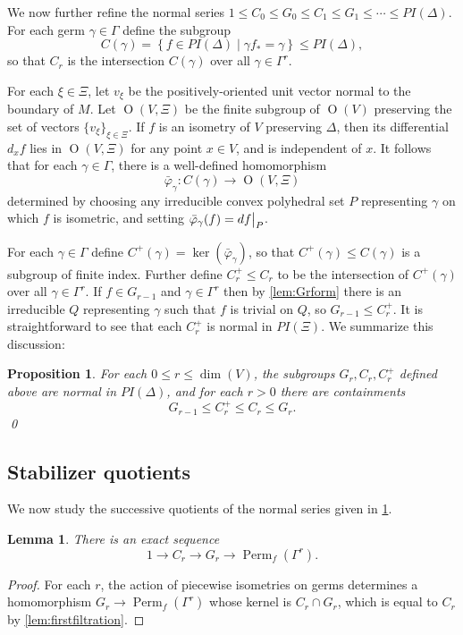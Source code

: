 \documentclass[11pt]{amsart}
\newtheorem{prop}[theorem]{Proposition}
\newtheorem{lemma}[theorem]{Lemma}
\numberwithin{table}{section}
\numberwithin{figure}{section}
\theoremstyle{remark}
\providecommand{\set}[1]{\left\lbrace#1\right\rbrace}
\DeclareMathOperator{\Perm}{Perm}
\DeclareMathOperator{\matrixO}{O}
\newcommand\restr[2]{{%
  \left.\kern-\nulldelimiterspace %
  #1 %
  \vphantom{\big|} %
  \right|_{#2} %
  }}
\newcommand\suchthat{ \mathrel{}\middle| \mathrel{}}
\begin{document}
We now further refine the normal series
$1\leq C_0 \leq G_0 \leq C_1\leq G_1\leq  \dotsb \leq PI(\Delta)$. For each germ
$\gamma \in \Gamma$ define the subgroup
\[C(\gamma) = \set{ f\in PI(\Delta) \suchthat \gamma f_\ast = \gamma}
  \leq PI(\Delta),
\]
so that $C_r$ is the intersection $C(\gamma)$ over all
$\gamma \in \Gamma^r$.

For each $\xi \in \Xi$, let $v_\xi$ be the positively-oriented unit
vector normal to the boundary of $M$. Let $\matrixO(V,\Xi)$ be the
finite subgroup of $\matrixO(V)$ preserving the set of vectors
$\{v_\xi\}_{\xi\in \Xi}$. If $f$ is an isometry of $V$ preserving
$\Delta$, then its differential $d_xf$ lies in $\matrixO(V,\Xi)$ for
any point $x\in V$, and is independent of $x$. It follows that for each
$\gamma\in \Gamma$, there is a well-defined homomorphism
\[
  \bar\varphi_\gamma : C(\gamma) \to \matrixO(V,\Xi)
\]
determined by choosing any irreducible convex polyhedral set $P$
representing $\gamma$ on which $f$ is isometric, and setting
$\bar\varphi_\gamma(f) = d \restr{f}{P}$.

For each $\gamma \in \Gamma$ define $C^+(\gamma) =
\ker(\bar\varphi_\gamma)$, so that $C^+(\gamma) \leq C(\gamma)$ is a
subgroup of finite index. Further define $C^+_r \leq C_r$ to be the
intersection of $C^+(\gamma)$ over all $\gamma \in \Gamma^r$. 
If $f\in G_{r-1}$ and $\gamma \in \Gamma^r$ then by
\cref{lem:Grform} there is an irreducible $Q$ representing
$\gamma$ such that $f$ is trivial on $Q$, so $G_{r-1} \leq C^+_r$. It
is straightforward to see that each $C^+_r$ is normal in
$PI(\Xi)$. We summarize this discussion:

\begin{prop} \label{prop:filtration} For each $0\leq r \leq \dim(V)$,
  the subgroups $G_r, C_r, C^+_r$ defined above are normal in
  $PI(\Delta)$, and for each $r>0$ there are containments
  \[
    G_{r-1} \leq C^+_r \leq C_r \leq G_r.
  \]
  \qed
\end{prop}

\subsection{Stabilizer quotients} \label{sec:sequences}

We now study the successive quotients of the normal series given in
\cref{prop:filtration}.


\begin{lemma} \label{lem:gr-mod-cr}
  There is an exact sequence
  \[
    1 \to C_r \to G_r \to \Perm_f(\Gamma^r).
  \]
\end{lemma}
\begin{proof}
For each $r$, the action of piecewise isometries on germs determines a
homomorphism $G_r \to \Perm_f(\Gamma^r)$ whose kernel is $C_r\cap
G_r$, which is equal to $C_r$ by \cref{lem:firstfiltration}. 
\end{proof}
\end{document}
